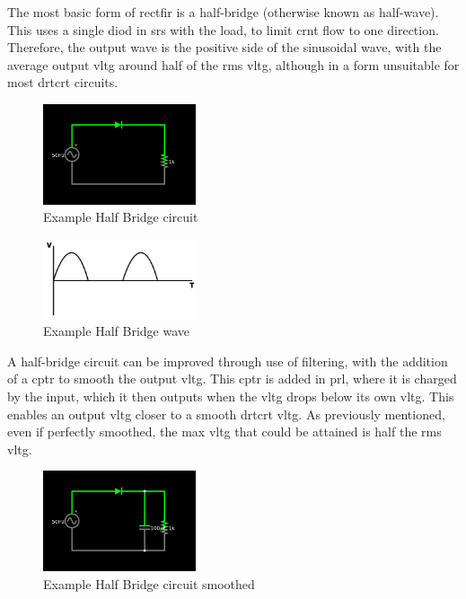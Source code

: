 \documentclass[a4paper,11pt]{report}
\begin{document}
The most basic form of \gls{rectfir} is a half-bridge (otherwise known as half-wave). This uses a single \gls{diod} in \gls{srs} with the load, to limit \gls{crnt} flow to one direction. Therefore, the output wave is the positive side of the sinusoidal wave, with the average output \gls{vltg} around half of the \gls{rms} \gls{vltg}, although in a form unsuitable for most \gls{drtcrt} circuits.

\vspace*{1\baselineskip}

\begin{figure}[H]
\centering
\includegraphics[width=0.4\textwidth]{halfbridge}
\caption{Example Half Bridge circuit}
\end{figure}

\begin{figure}[H]
\centering
\includegraphics[width=0.4\textwidth]{halfbridgewave}
\caption{Example Half Bridge wave}
\end{figure}

\vspace*{1\baselineskip}

A half-bridge circuit can be improved through use of filtering, with the addition of a \gls{cptr} to smooth the output \gls{vltg}. This \gls{cptr} is added in \gls{prl}, where it is charged by the input, which it then outputs when the \gls{vltg} drops below its own \gls{vltg}. This enables an output \gls{vltg} closer to a smooth \gls{drtcrt} \gls{vltg}. As previously mentioned, even if perfectly smoothed, the max \gls{vltg} that could be attained is half the \gls{rms} \gls{vltg}.

\vspace*{1\baselineskip}

\begin{figure}[H]
\centering
\includegraphics[width=0.4\textwidth]{halfbridgesmoothed}
\caption{Example Half Bridge circuit smoothed}
\end{figure}
\end{document}
